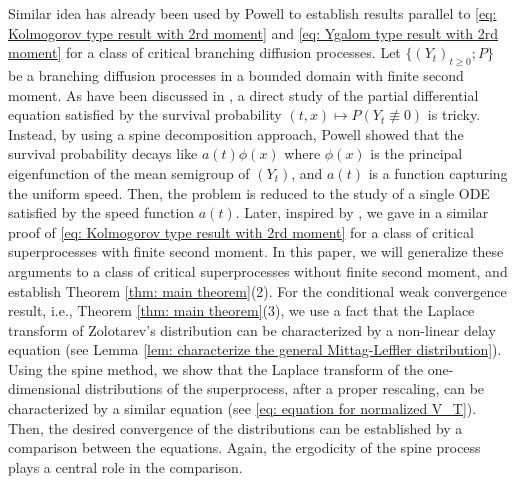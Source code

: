 \documentclass[12pt, a4paper]{amsart}
\theoremstyle{definition}
\numberwithin{equation}{section}
\begin{document}
	Similar idea
	has already been used by Powell \cite{Powell2015An-invariance} to establish results parallel to \eqref{eq: Kolmogorov type result with 2rd moment} and \eqref{eq: Ygalom type result with 2rd moment} for a class of critical branching diffusion processes.
	Let $\{(Y_t)_{t\geq 0}; P\}$
	be a branching diffusion processes in a bounded domain with finite second moment.
	As have been discussed in \cite{Powell2015An-invariance}, a direct study of the partial differential equation
	satisfied by the survival probability $(t,x) \mapsto P(Y_t \not\equiv 0)$ is tricky.
	Instead, by using a spine decomposition approach, Powell \cite{Powell2015An-invariance} showed that the survival probability decays like $a(t)\phi(x)$ where $\phi(x)$ is the principal eigenfunction of the mean semigroup of $(Y_t)$, and $a(t)$ is a function capturing the uniform speed.
	Then, the problem is reduced to the study of a single ODE satisfied by the speed function $a(t)$.
	Later, inspired by \cite{Powell2015An-invariance}, we gave in \cite{RenSongSun2017Spine} a similar proof of \eqref{eq: Kolmogorov type result with 2rd moment} for a class of critical superprocesses with finite second moment.
	In this paper, we will  generalize these arguments to a class of critical superprocesses without finite second moment, and establish Theorem \ref{thm: main theorem}(2).
	For the conditional weak convergence result, i.e., Theorem \ref{thm: main theorem}(3), we use a fact that the Laplace transform of Zolotarev's distribution can be characterized by a non-linear delay equation (see Lemma \ref{lem: characterize the general Mittag-Leffler distribution}).
	Using the spine method, we show that the Laplace transform of 
	the one-dimensional distributions 
	of the superprocess, after a proper rescaling, 
	can be
	characterized by a similar equation (see \eqref{eq: equation for normalized V_T}).
	Then, the desired convergence of the distributions can be established by a comparison between the equations.	
	Again, the ergodicity of the spine process plays a central role in the comparison.
	
\end{document}
